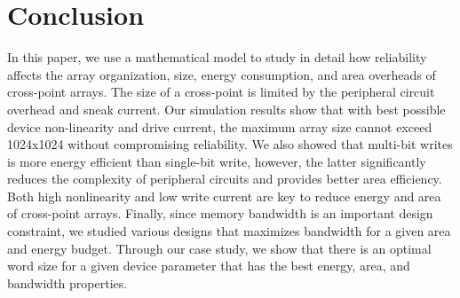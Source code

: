 \vspace{-5pt}
\section{Conclusion}\label{sec:conclusion}
In this paper, we use a mathematical model to study in detail how reliability
affects the array organization, size, energy consumption, and area overheads of
cross-point arrays.  The size of a cross-point is limited by the peripheral
circuit overhead and sneak current.  Our simulation results show that with best
possible device non-linearity and drive current, the maximum array size cannot
exceed 1024x1024 without compromising reliability.  We also showed that
multi-bit writes is more energy efficient than single-bit write, however, the
latter significantly reduces the complexity of peripheral circuits and provides
better area efficiency.  Both high nonlinearity and low write current are key
to reduce energy and area of cross-point arrays.  Finally, since memory
bandwidth is an important design constraint, we studied various designs that
maximizes bandwidth for a given area and energy budget.  Through our case
study, we show that there is an optimal word size for a given device parameter
that has the best energy, area, and bandwidth properties. 
